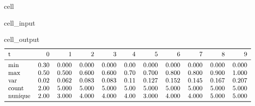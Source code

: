 \documentclass[letterpaper,table,10pt,english]{jupyterBook}
\begin{document}
\begin{sphinxuseclass}{cell}\begin{sphinxVerbatimInput}

\begin{sphinxuseclass}{cell_input}
\begin{sphinxVerbatim}[commandchars=\\\{\}]
\PYG{p}{[}\PYG{p}{]}
\end{sphinxVerbatim}

\end{sphinxuseclass}\end{sphinxVerbatimInput}
\begin{sphinxVerbatimOutput}

\begin{sphinxuseclass}{cell_output}\begin{equation*}
\begin{split}\begin{tabular}{lrrrrrrrrrr}
\toprule
t &     0 &      1 &      2 &      3 &     4 &      5 &      6 &      7 &      8 &      9 \\
\midrule
min     &  0.30 &  0.000 &  0.000 &  0.000 &  0.00 &  0.000 &  0.000 &  0.000 &  0.000 &  0.000 \\
max     &  0.50 &  0.500 &  0.600 &  0.600 &  0.70 &  0.700 &  0.800 &  0.800 &  0.900 &  1.000 \\
var     &  0.02 &  0.062 &  0.083 &  0.083 &  0.11 &  0.127 &  0.152 &  0.145 &  0.167 &  0.207 \\
count   &  2.00 &  5.000 &  5.000 &  5.000 &  5.00 &  5.000 &  5.000 &  5.000 &  5.000 &  5.000 \\
nunique &  2.00 &  3.000 &  4.000 &  4.000 &  4.00 &  3.000 &  4.000 &  4.000 &  5.000 &  5.000 \\
\bottomrule
\end{tabular}\end{split}
\end{equation*}
\end{sphinxuseclass}\end{sphinxVerbatimOutput}

\end{sphinxuseclass}
\end{document}

